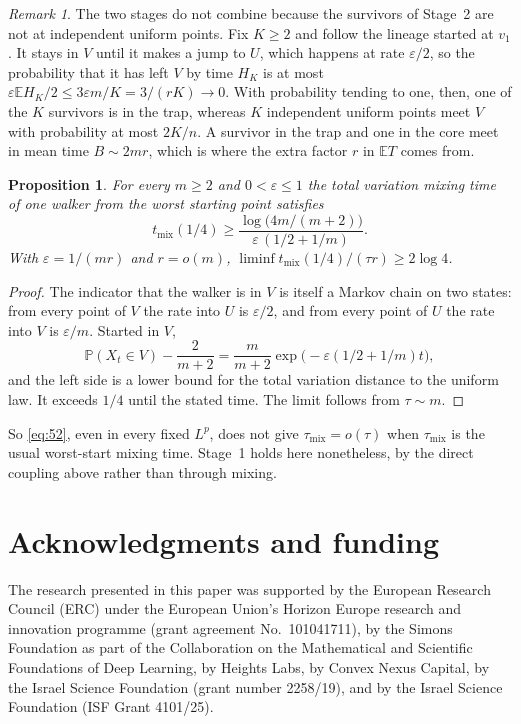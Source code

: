 \documentclass[11pt,a4paper]{article}
\numberwithin{equation}{section}
\newtheorem{proposition}[theorem]{Proposition}
\theoremstyle{remark}
\newtheorem{remark}[theorem]{Remark}
\newcommand{\E}{\mathbb E}
\newcommand{\Pp}{\mathbb P}
\newcommand{\eps}{\varepsilon}
\begin{document}
\begin{remark}\label{rem:handoff}
The two stages do not combine because the survivors of Stage~2 are not at independent uniform points. Fix $K\ge2$ and follow the lineage started at $v_1$. It stays in $V$ until it makes a jump to $U$, which happens at rate $\eps/2$, so the probability that it has left $V$ by time $H_K$ is at most $\eps\E H_K/2\le3\eps m/K=3/(rK)\to0$. With probability tending to one, then, one of the $K$ survivors is in the trap, whereas $K$ independent uniform points meet $V$ with probability at most $2K/n$. A survivor in the trap and one in the core meet in mean time $B\sim2mr$, which is where the extra factor $r$ in $\E T$ comes from.
\end{remark}

\begin{proposition}\label{prop:mix}
For every $m\ge2$ and $0<\eps\le1$ the total variation mixing time of one walker from the worst starting point satisfies
\[
t_{\mathrm{mix}}(1/4)\ge\frac{\log\bigl(4m/(m+2)\bigr)}{\eps\,(1/2+1/m)} .
\]
With $\eps=1/(mr)$ and $r=o(m)$, $\liminf t_{\mathrm{mix}}(1/4)/(\tau r)\ge2\log4$.
\end{proposition}

\begin{proof}
The indicator that the walker is in $V$ is itself a Markov chain on two states: from every point of $V$ the rate into $U$ is $\eps/2$, and from every point of $U$ the rate into $V$ is $\eps/m$. Started in $V$,
\[
\Pp(X_t\in V)-\frac2{m+2}=\frac m{m+2}\exp\bigl(-\eps(1/2+1/m)t\bigr),
\]
and the left side is a lower bound for the total variation distance to the uniform law. It exceeds $1/4$ until the stated time. The limit follows from $\tau\sim m$.
\end{proof}

So \eqref{eq:52}, even in every fixed $L^p$, does not give $\tau_{\mathrm{mix}}=o(\tau)$ when $\tau_{\mathrm{mix}}$ is the usual worst-start mixing time. Stage~1 holds here nonetheless, by the direct coupling above rather than through mixing.

\section*{Acknowledgments and funding}
The research presented in this paper was supported by the European Research Council (ERC) under the European Union's Horizon Europe research and innovation programme (grant agreement No.~101041711), by the Simons Foundation as part of the Collaboration on the Mathematical and Scientific Foundations of Deep Learning, by Heights Labs, by Convex Nexus Capital, by the Israel Science Foundation (grant number 2258/19), and by the Israel Science Foundation (ISF Grant 4101/25).
\end{document}
